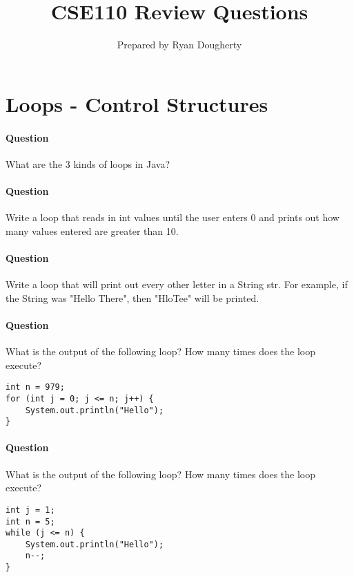 \documentclass{article}
\title{CSE110 Review Questions}
\author{Prepared by Ryan Dougherty}
\date{}
\begin{document}
\maketitle

\section*{Loops - Control Structures}

\setcounter{question_num}{1}
\paragraph{Question }
What are the 3 kinds of loops in Java?

\addtocounter{question_num}{1}
\paragraph{Question }
Write a loop that reads in int values until the user enters 0 and prints out how many values entered are greater than 10.

\addtocounter{question_num}{1}
\paragraph{Question }
Write a loop that will print out every other letter in a String str. For example, if the String was "Hello There", then "HloTee" will be printed.

\addtocounter{question_num}{1}
\paragraph{Question }
What is the output of the following loop? How many times does the loop execute?
\begin{lstlisting}
int n = 979;
for (int j = 0; j <= n; j++) {
	System.out.println("Hello");
}
\end{lstlisting}

\addtocounter{question_num}{1}
\paragraph{Question }
What is the output of the following loop? How many times does the loop execute?
\begin{lstlisting}
int j = 1;
int n = 5;
while (j <= n) {
	System.out.println("Hello");
	n--;
}
\end{lstlisting}
\end{document}
